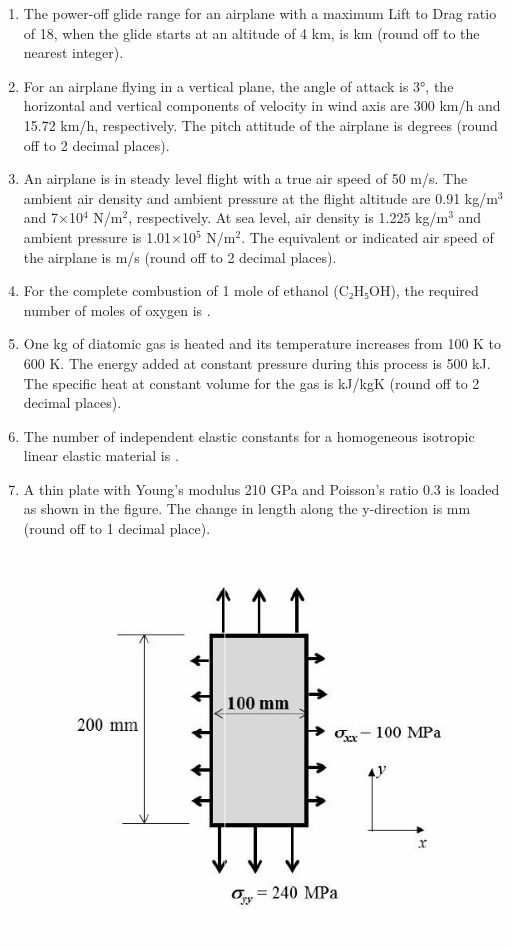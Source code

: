 \documentclass{article}
\begin{document}
\begin{enumerate}[leftmargin=*, resume]
\item The power-off glide range for an airplane with a maximum Lift to Drag ratio of 18, when the glide starts at an altitude of 4 km, is \underline{\hspace{1.5cm}} km (round off to the nearest integer).

\item For an airplane flying in a vertical plane, the angle of attack is 3°, the horizontal and vertical components of velocity in wind axis are 300 km/h and 15.72 km/h, respectively. The pitch attitude of the airplane is \underline{\hspace{1.5cm}} degrees (round off to 2 decimal places).

\item An airplane is in steady level flight with a true air speed of 50 m/s. The ambient air density and ambient pressure at the flight altitude are 0.91 kg/m\(^3\) and 7×10\(^4\) N/m\(^2\), respectively. At sea level, air density is 1.225 kg/m\(^3\) and ambient pressure is 1.01×10\(^5\) N/m\(^2\). The equivalent or indicated air speed of the airplane is \underline{\hspace{1.5cm}} m/s (round off to 2 decimal places).

\item For the complete combustion of 1 mole of ethanol (C₂H₅OH), the required number of moles of oxygen is \underline{\hspace{1.5cm}}.

\item One kg of diatomic gas is heated and its temperature increases from 100 K to 600 K. The energy added at constant pressure during this process is 500 kJ. The specific heat at constant volume for the gas is \underline{\hspace{1.5cm}} kJ/kgK (round off to 2 decimal places).

\item The number of independent elastic constants for a homogeneous isotropic linear elastic material is \underline{\hspace{1.5cm}}.

\item A thin plate with Young’s modulus 210 GPa and Poisson’s ratio 0.3 is loaded as shown in the figure. The change in length along the y-direction is \underline{\hspace{1.5cm}} mm (round off to 1 decimal place).
\begin{figure}[H]
    \centering
    \includegraphics[width=0.3\linewidth]{figs/q30.png}
    \caption{}
    \label{fig:q30}
\end{figure}


\end{enumerate}
\end{document}
